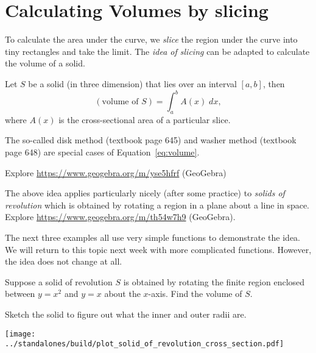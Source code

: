 \documentclass[../main.tex]{subfiles}
\begin{document}
 \section{Calculating Volumes by slicing}
  To calculate the area under the curve, we \emph{slice} the region under the curve into tiny rectangles and take the limit. The \emph{idea of slicing} can be adapted to calculate the volume of a solid.

  \begin{mdframed}[style=withref-compact]
    Let \(S\) be a solid (in three dimension) that lies over an interval \([a,b]\), then
    \begin{equation} \label{eq:volume}
      (\text{volume of } S) = \int_{a}^{b} A(x) \;dx,
    \end{equation}
    where \(A(x)\) is the cross-sectional area of a particular slice.

    The so-called disk method (textbook page 645) and washer method (textbook page 648) are special cases of Equation~\eqref{eq:volume}.
  \end{mdframed}

  {\footnotesize Explore \url{https://www.geogebra.org/m/yse5hfrf} (GeoGebra)}


  The above idea applies particularly nicely (after some practice) to \emph{solids of revolution} which is obtained by rotating a region in a plane about a line in space. \\
  {\footnotesize Explore \url{https://www.geogebra.org/m/th54w7h9} (GeoGebra).}
  \clearpage


  The next three examples all use very simple functions to demonstrate the idea. We will return to this topic next week with more complicated functions. However, the idea does not change at all.

  \begin{example}
    Suppose a solid of revolution \(S\) is obtained by rotating the finite region enclosed between \(y = x^{2}\) and \(y = x\) about the \(x\)-axis. Find the volume of \(S\).


    Sketch the solid to figure out what the inner and outer radii are.

    \texttt{[image: ../standalones/build/plot\_solid\_of\_revolution\_cross\_section.pdf]}
  \end{example}
  \clearpage
\end{document}
